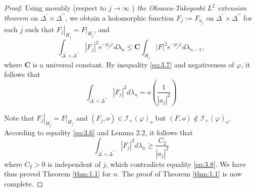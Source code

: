 \documentclass[lang=en,12pt,twoside]{textbook}
\begin{document}
\begin{proof}
Using movably (respect to $j \rightarrow \infty$ ) \textit{the Ohsawa-Takegoshi $L^2$ extension theorem} on $\Delta^{\prime} \times \Delta^{\prime \prime}$, we obtain a holomorphic function $F_j:=F_{a_j}$ on $\Delta^{\prime} \times \Delta^{\prime \prime}$ for each $j$ such that $\left.F_j\right|_{H_j}=\left.F\right|_{H_j}$, and
$$
\int_{\Delta^{\prime} \times \Delta^{\prime \prime}}\left|F_j\right|^2 e^{-p_j \varphi} d \lambda_n \leq \mathbf{C} \int_{H_j}|F|^2 e^{-p_j \varphi} d \lambda_{n-1},
$$
where $\mathbf{C}$ is a universal constant.
By inequality \eqref{eq:3.7} and negativeness of $\varphi$, it follows that
\begin{equation}\label{eq:3.8}
    \int_{\Delta^{\prime} \times \Delta^{\prime \prime}}\left|F_j\right|^2 d \lambda_n=o\left(\frac{1}{\left|a_j\right|^2}\right)
\end{equation}

Note that $\left.F_j\right|_{H_j}=\left.F\right|_{H_j}$ and $\left(F_j, o\right) \in \mathcal{I}_{+}(\varphi)_o$ but $(F, o) \notin \mathcal{I}_{+}(\varphi)_o$. According to equality \eqref{eq:3.6} and Lemma 2.2, it follows that
$$
\int_{\Delta^{\prime} \times \Delta^{\prime \prime}}\left|F_j\right|^2 d \lambda_n \geq \frac{C_2}{\left|a_j\right|^2}
$$
where $C_2>0$ is independent of $j$, which contradicts equality \eqref{eq:3.8}.
We have thus proved Theorem \ref{thm:1.1} for $n$. The proof of Theorem \ref{thm:1.1} is now complete.


\end{proof}


\end{document}
